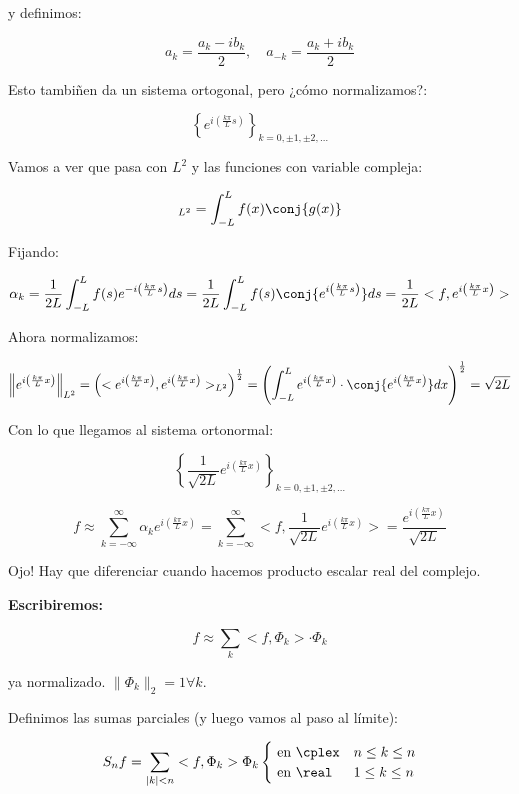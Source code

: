 		y definimos:

		\[
			a_k = \frac{a_k - ib_k}{2}, \quad a_{-k} = \frac{a_k + ib_k}{2}
		\]

		Esto tambiñen da un sistema ortogonal, pero ¿cómo normalizamos?:

		\[\left\{ e^{i \left( \frac{k \pi}{L} s \right)} \right\}_{k = 0,±1,±2,…} \]

		Vamos a ver que pasa con $L^2$ y las funciones con variable compleja:

		\[<f,g>_{L^2} = \int^L_{-L} f(x) \conj{g(x)} \]

		Fijando:

		\[ \alpha_k = \frac{1}{2L} \int^L_{-L} f(s) e^{-i \left( \frac{k \pi}{L} s \right)} ds = \frac{1}{2L} \int_{-L}^L f(s) \conj{e^{i \left( \frac{k \pi}{L} s \right)}} ds = \frac{1}{2L} <f, e^{i \left( \frac{k \pi}{L} x \right)}> \]

		Ahora normalizamos:

		\[
		\left\|e^{i \left( \frac{k \pi}{L} x \right)}\right\|_{L^2} = \left( < e^{i \left( \frac{k \pi}{L} x \right)}, e^{i \left( \frac{k \pi}{L} x \right)} >_{L^2} \right)^{\frac{1}{2}} = \left( \int^{L}_{-L} e^{i \left( \frac{k \pi}{L} x \right)} \cdot \conj{ e^{i \left( \frac{k \pi}{L} x \right)}} dx \right)^{\frac{1}{2}} = \sqrt{2L}
		\]

		Con lo que llegamos al sistema ortonormal:

		\[
			\left\{ \frac{1}{\sqrt{2L}} e^{i \left( \frac{k \pi}{L} x \right)} \right\}_{k = 0, ±1, ±2, …}
		\]

		\[
		f ≈ \sum_{k=-\infty}^\infty \alpha_k e^{i \left( \frac{k \pi}{L} x \right)} = \sum_{k = -\infty}^\infty < f, \frac{1}{\sqrt{2L}} e^{i \left( \frac{k \pi}{L} x \right)} > = \frac{e^{i \left( \frac{k \pi}{L} x \right)}}{\sqrt{2L}}
		\]

		\obs Ojo! Hay que diferenciar cuando hacemos producto escalar real del complejo.

		\textbf{Escribiremos:}

		\[ f ≈ \sum_k <f, \Phi_k> \cdot \Phi_k \]

		ya normalizado. $\|\Phi_k\|_2 = 1 \forall k$.

		Definimos las sumas parciales (y luego vamos al paso al límite):

		\[
		S_n f = \sum_{|k| < n} <f, \Phi_k> \Phi_k \begin{cases}
			\text{ en } \cplex & n \leq k \leq n \\
			\text{ en } \real & 1 \leq k \leq n
		\end{cases}
		\]

